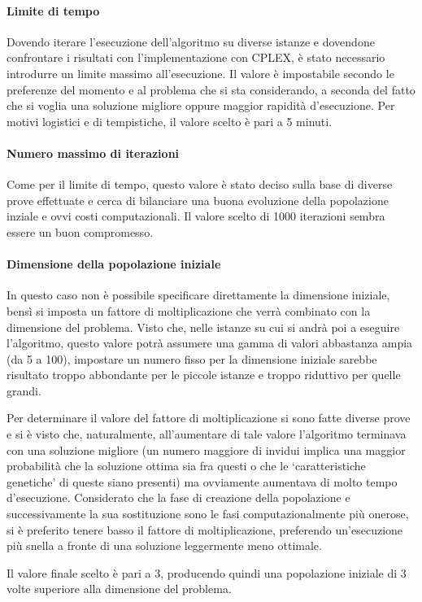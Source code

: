 \paragraph{Limite di tempo}
Dovendo iterare l'esecuzione dell'algoritmo su diverse istanze e dovendone confrontare i risultati
con l'implementazione con CPLEX, è stato necessario introdurre un limite massimo all'esecuzione.
Il valore è impostabile secondo le preferenze del momento e al problema che si sta considerando,
a seconda del fatto che si voglia una soluzione migliore oppure maggior rapidità d'esecuzione.
Per motivi logistici e di tempistiche, il valore scelto è pari a 5 minuti.
%
\paragraph{Numero massimo di iterazioni}
Come per il limite di tempo, questo valore è stato deciso sulla base di diverse prove effettuate
e cerca di bilanciare una buona evoluzione della popolazione inziale e ovvi costi computazionali.
Il valore scelto di 1000 iterazioni sembra essere un buon compromesso.
%
\paragraph{Dimensione della popolazione iniziale}
In questo caso non è possibile specificare direttamente la dimensione iniziale, bensì si imposta
un fattore di moltiplicazione che verrà combinato con la dimensione del problema.
Visto che, nelle istanze su cui si andrà poi a eseguire l'algoritmo, questo valore
potrà assumere una gamma di valori abbastanza ampia (da 5 a 100), impostare un numero fisso
per la dimensione iniziale sarebbe risultato troppo abbondante per le piccole istanze
e troppo riduttivo per quelle grandi.

Per determinare il valore del fattore di moltiplicazione si sono fatte diverse prove e si è visto
che, naturalmente, all'aumentare di tale valore l'algoritmo terminava con una soluzione migliore
(un numero maggiore di invidui implica una maggior probabilità che la soluzione ottima sia fra questi
o che le `caratteristiche genetiche' di queste siano presenti) ma ovviamente aumentava di molto tempo d'esecuzione.
Considerato che la fase di creazione della popolazione e successivamente la sua sostituzione sono le fasi
computazionalmente più onerose, si è preferito tenere basso il fattore di moltiplicazione, preferendo
un'esecuzione più snella a fronte di una soluzione leggermente meno ottimale.

Il valore finale scelto è pari a 3, producendo quindi una popolazione iniziale di 3 volte superiore
alla dimensione del problema.
%
